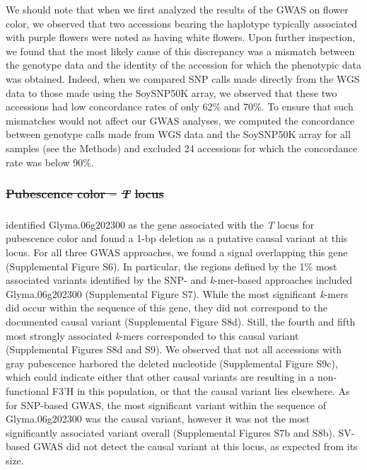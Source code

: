 \documentclass{article}
\providecommand{\DIFaddtex}[1]{{\protect\color{blue}\uwave{#1}}} %
\providecommand{\DIFdeltex}[1]{{\protect\color{red}\sout{#1}}}                      %
\providecommand{\DIFaddbegin}{} %
\providecommand{\DIFaddend}{} %
\providecommand{\DIFdelbegin}{} %
\providecommand{\DIFdelend}{} %
\providecommand{\DIFadd}[1]{\texorpdfstring{\DIFaddtex{#1}}{#1}} %
\providecommand{\DIFdel}[1]{\texorpdfstring{\DIFdeltex{#1}}{}} %
\newcommand{\DIFscaledelfig}{0.5}
\newlength{\DIFdelgraphicswidth} %
\newlength{\DIFdelgraphicsheight} %
\newcommand{\DIFaddincludegraphics}[2][]{{\color{blue}\fbox{\DIFOincludegraphics[#1]{#2}}}} %
\newcommand{\DIFdelincludegraphics}[2][]{%
\sbox{\DIFdelgraphicsbox}{\DIFOincludegraphics[#1]{#2}}%
\settoboxwidth{\DIFdelgraphicswidth}{\DIFdelgraphicsbox} %
\settoboxtotalheight{\DIFdelgraphicsheight}{\DIFdelgraphicsbox} %
\scalebox{\DIFscaledelfig}{%
\parbox[b]{\DIFdelgraphicswidth}{\usebox{\DIFdelgraphicsbox}\\[-\baselineskip] \rule{\DIFdelgraphicswidth}{0em}}\llap{\resizebox{\DIFdelgraphicswidth}{\DIFdelgraphicsheight}{%
\setlength{\unitlength}{\DIFdelgraphicswidth}%
\begin{picture}(1,1)%
\thicklines\linethickness{2pt} %
{\color[rgb]{1,0,0}\put(0,0){\framebox(1,1){}}}%
{\color[rgb]{1,0,0}\put(0,0){\line( 1,1){1}}}%
{\color[rgb]{1,0,0}\put(0,1){\line(1,-1){1}}}%
\end{picture}%
}\hspace*{3pt}}} %
} %
\DeclareRobustCommand{\DIFaddbegin}{\DIFOaddbegin \let\includegraphics\DIFaddincludegraphics} %
\DeclareRobustCommand{\DIFaddend}{\DIFOaddend \let\includegraphics\DIFOincludegraphics} %
\DeclareRobustCommand{\DIFdelbegin}{\DIFOdelbegin \let\includegraphics\DIFdelincludegraphics} %
\DeclareRobustCommand{\DIFdelend}{\DIFOaddend \let\includegraphics\DIFOincludegraphics} %
\begin{document}
We should note that when we first analyzed the results of the GWAS on flower
color, we observed that two accessions bearing the haplotype typically
associated with purple flowers were noted as having white flowers. Upon further
inspection, we found that the most likely cause of this discrepancy was a
mismatch between the genotype data and the identity of the accession for which
the phenotypic data was obtained. Indeed, when we compared SNP calls made
directly from the WGS data to those made using the SoySNP50K array, we observed
that these two accessions had low concordance rates of only 62\% and 70\%. To
ensure that such mismatches would not affect our GWAS analyses, we computed the
concordance between genotype calls made from WGS data and the SoySNP50K array
for all samples (see the Methods) and excluded 24 accessions for which the
concordance rate was below 90\%.

\DIFdelbegin \subsubsection*{\DIFdel{Pubescence color -- }\textit{\DIFdel{T}} %
\DIFdel{locus}}
\DIFdelend \DIFaddbegin \subsubsection{\DIFadd{Pubescence color -- }\textit{\DIFadd{T}} \DIFadd{locus}}
\DIFaddend 

 identified Glyma.06g202300 as the gene associated with the
\textit{T} locus for pubescence color and found a 1-bp deletion as a putative
causal variant at this locus. For all three GWAS approaches, we found a signal
overlapping this gene (Supplemental Figure S6). In
particular, the regions defined by the 1\% most associated variants
identified by the SNP- and \textit{k}-mer-based approaches included
Glyma.06g202300 (Supplemental Figure S7). While the most
significant \textit{k}-mers did occur within the sequence of this gene, they
did not correspond to the documented causal variant (Supplemental Figure
S8d).  Still, the fourth and fifth most strongly
associated \textit{k}-mers corresponded to this causal variant (Supplemental Figures
S8d and S9). We
observed that not all accessions with gray pubescence harbored the deleted
nucleotide (Supplemental Figure S9c), which could indicate
either that other causal variants are resulting in a non-functional F3’H in
this population, or that the causal variant lies elsewhere. As for SNP-based GWAS,
the most significant variant within the sequence of Glyma.06g202300 was the
causal variant, however it was not the most significantly associated variant
overall (Supplemental Figures S7b and
S8b). SV-based GWAS did not detect the causal variant
at this locus, as expected from its size.
\end{document}
